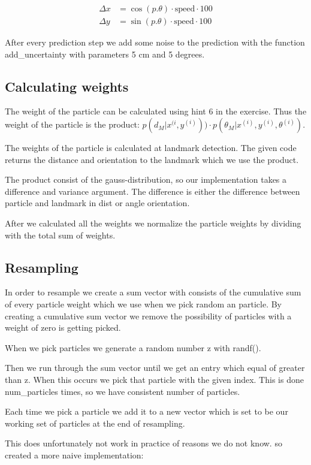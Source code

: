 \documentclass[a4paper,12pt]{article}
\begin{document}
\begin{align*}
\Delta x &= \cos(p.\theta)\cdot\text{speed}\cdot 100\\
\Delta y &= \sin(p.\theta)\cdot\text{speed}\cdot 100
\end{align*}

After every prediction step we add some noise to the prediction with the function add\_uncertainty with parameters 5 cm and 5 degrees. 
\subsection{Calculating weights}
The weight of the particle can be calculated using hint 6 in the exercise. Thus the weight of the particle is the product: $p(d_M | x^{(i}, y^{(i)})) \cdot  p(\theta_M |x^{(i)} , y^{(i)} , \theta^{(i)} ) $. 

The weights of the particle is calculated at landmark detection. The given code returns the distance and orientation to the landmark which we use the product. 

The product consist of the gauss-distribution, so our implementation takes a difference and variance argument. The difference is either the difference between particle and landmark in dist or angle orientation. 

After we calculated all the weights we normalize the particle weights by dividing with the total sum of weights. 

\subsection{Resampling}
In order to resample we create a sum vector with consists of the cumulative sum of every particle weight which we use when we pick random an particle. By creating a cumulative sum vector we remove the possibility of particles with a weight of zero is getting picked.

When we pick particles we generate a random number z with randf().

Then we run through the sum vector until we get an entry which equal of greater than z. When this occurs we pick that particle with the given index. This is done num\_particles times, so we have consistent number of particles.

Each time we pick a particle we add it to a new vector which is set to be our working set of particles at the end of resampling.

This does unfortunately not work in practice of reasons we do not know. so created a more naive implementation: 
\end{document}
